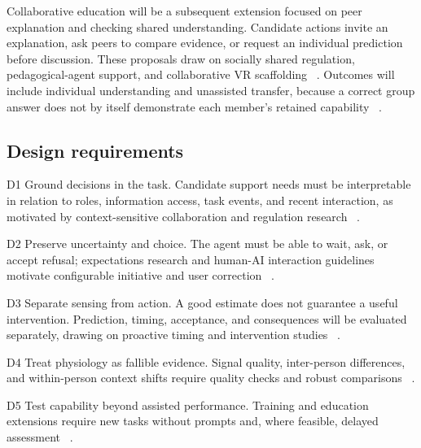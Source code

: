 Collaborative education will be a subsequent extension focused on peer explanation and checking shared understanding. Candidate actions invite an explanation, ask peers to compare evidence, or request an individual prediction before discussion. These proposals draw on socially shared regulation, pedagogical-agent support, and collaborative VR scaffolding ~\cite{p29,p27,p51}. Outcomes will include individual understanding and unassisted transfer, because a correct group answer does not by itself demonstrate each member's retained capability ~\cite{p10,p62}.


\subsection{Design requirements}

D1 Ground decisions in the task. Candidate support needs must be interpretable in relation to roles, information access, task events, and recent interaction, as motivated by context-sensitive collaboration and regulation research ~\cite{p57,p29,huang}.

D2 Preserve uncertainty and choice. The agent must be able to wait, ask, or accept refusal; expectations research and human-AI interaction guidelines motivate configurable initiative and user correction ~\cite{expect,p3}.

D3 Separate sensing from action. A good estimate does not guarantee a useful intervention. Prediction, timing, acceptance, and consequences will be evaluated separately, drawing on proactive timing and intervention studies ~\cite{sensing,speaker,calm}.

D4 Treat physiology as fallible evidence. Signal quality, inter-person differences, and within-person context shifts require quality checks and robust comparisons ~\cite{artifacts,hhiss,crop}.

D5 Test capability beyond assisted performance. Training and education extensions require new tasks without prompts and, where feasible, delayed assessment ~\cite{p62}.
